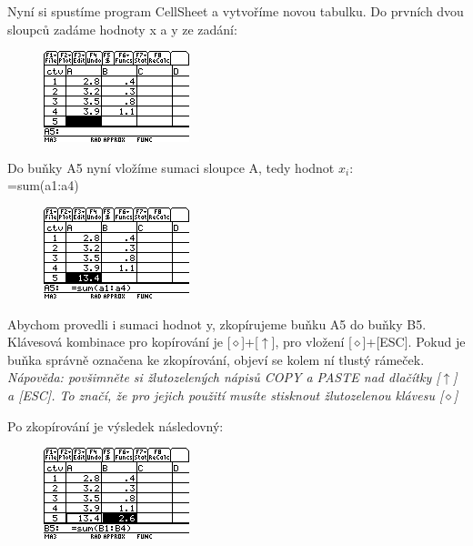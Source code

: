 \documentclass[10pt,a4paper,float]{article}
\begin{document}
Nyní si spustíme program CellSheet a vytvoříme novou tabulku. Do prvních dvou sloupců zadáme hodnoty x a y ze zadání:

\begin{figure}[H]
	\centering
	\includegraphics[width=.5\textwidth]{img/CTVERCE1.PNG}
\end{figure}

\pagebreak

Do buňky A5 nyní vložíme sumaci sloupce A, tedy hodnot $x_i$:\\
=sum(a1:a4)

\begin{figure}[H]
	\centering
	\includegraphics[width=.5\textwidth]{img/CTVERCE2.PNG}
\end{figure}

Abychom provedli i sumaci hodnot y, zkopírujeme buňku A5 do buňky B5. Klávesová kombinace pro kopírování je [$\diamond$]+[$\uparrow$], pro vložení [$\diamond$]+[ESC]. Pokud je buňka správně označena ke zkopírování, objeví se kolem ní tlustý rámeček.\\
\textit{Nápověda: povšimněte si žlutozelených nápisů COPY a PASTE nad dlačítky [$\uparrow$] a [ESC]. To značí, že pro jejich použití musíte stisknout žlutozelenou klávesu [$\diamond$]}

Po zkopírování je výsledek následovný:

\begin{figure}[H]
	\centering
	\includegraphics[width=.5\textwidth]{img/CTVERCE3.PNG}
\end{figure}
\end{document}

